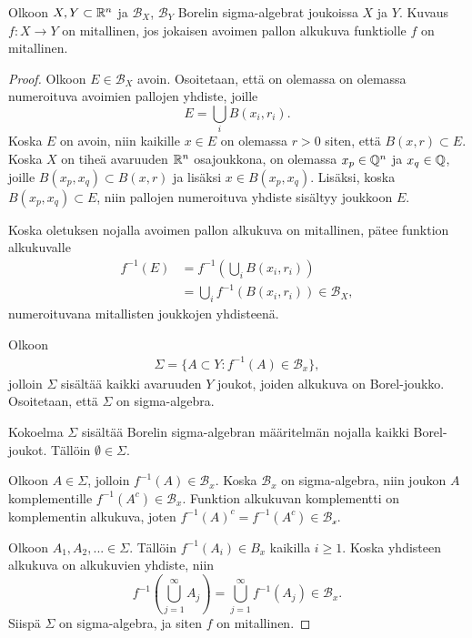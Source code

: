 \documentclass[12pt,oneside,a4paper]{amsbook} %
\begin{document}
\begin{lemma}\label{le:measurableIfBallMeasurable}
    Olkoon $X, Y \subset \mathbb{R}^n$ ja $\mathcal B_X$, $\mathcal B_Y$ Borelin sigma-algebrat joukoissa $X$ ja $Y$. Kuvaus $f: X \to Y$ on mitallinen, jos jokaisen avoimen pallon alkukuva funktiolle $f$ on mitallinen.
\end{lemma}
\begin{proof}
    Olkoon $E\in\mathcal B_X$ avoin. Osoitetaan, että on olemassa on olemassa numeroituva avoimien pallojen yhdiste, joille
    \begin{equation*}
        E = \bigcup_i B(x_i, r_i).
    \end{equation*}
    Koska $E$ on avoin, niin kaikille $x \in E$ on olemassa $r > 0$ siten, että $B(x, r) \subset E$. Koska $X$ on tiheä avaruuden $\mathbb{R}^n$ osajoukkona, on olemassa $x_p \in \mathbb{Q}^n$ ja $x_q \in \mathbb{Q}$, joille $B(x_p, x_q) \subset B(x, r)$ ja lisäksi $x \in B(x_p, x_q)$. Lisäksi, koska $B(x_p, x_q) \subset E$, niin pallojen numeroituva yhdiste sisältyy joukkoon $E$.
    
    Koska oletuksen nojalla avoimen pallon alkukuva on mitallinen, pätee funktion alkukuvalle
    \begin{align*}
        f^{-1}(E) &= f^{-1}\left(\bigcup_i B(x_i, r_i)\right) \\
        &= \bigcup_i f^{-1}(B(x_i, r_i)) \in \mathcal B_X,
    \end{align*}
    numeroituvana mitallisten joukkojen yhdisteenä. 
    
    Olkoon 
    \begin{align*}
        \Sigma =\{A \subset Y : f^{-1}(A) \in \mathcal B_x\},
    \end{align*}
    jolloin $\Sigma$ sisältää kaikki avaruuden $Y$ joukot, joiden alkukuva on Borel-joukko. Osoitetaan, että $\Sigma$ on sigma-algebra. 
    
    Kokoelma $\Sigma$ sisältää Borelin sigma-algebran määritelmän nojalla kaikki Borel-joukot. Tällöin $\emptyset \in \Sigma$. 
    
    Olkoon $A \in \Sigma$, jolloin $f^{-1}(A) \in \mathcal B_x$. Koska $\mathcal B_x$ on sigma-algebra, niin joukon $A$ komplementille $f^{-1}(A^c) \in \mathcal B_x$. Funktion alkukuvan komplementti on komplementin alkukuva, joten $f^{-1}(A)^c = f^{-1}(A^c) \in \mathcal{B_x}$.
    
    Olkoon $A_1, A_2, ... \in \Sigma$. Tällöin $f^{-1}(A_i) \in B_x$ kaikilla $i \ge 1$. Koska yhdisteen alkukuva on alkukuvien yhdiste, niin
    \begin{equation*}
        f^{-1}\left(\bigcup_{j=1}^\infty A_j\right) = \bigcup_{j=1}^\infty f^{-1}(A_j) \in \mathcal{B}_x.
    \end{equation*}
    Siispä $\Sigma$ on sigma-algebra, ja siten $f$ on mitallinen.
\end{proof}
\end{document}
